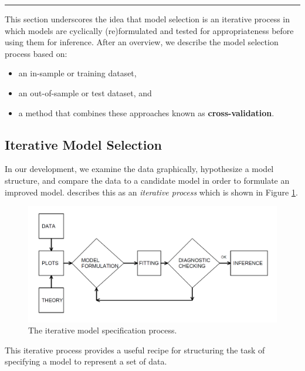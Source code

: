 \documentclass[]{book}
\providecommand{\tightlist}{%
  \setlength{\itemsep}{0pt}\setlength{\parskip}{0pt}}
\theoremstyle{definition}
\theoremstyle{definition}
\theoremstyle{definition}
\theoremstyle{remark}
\begin{document}
\begin{center}\rule{0.5\linewidth}{\linethickness}\end{center}

This section underscores the idea that model selection is an iterative
process in which models are cyclically (re)formulated and tested for
appropriateness before using them for inference. After an overview, we
describe the model selection process based on:

\begin{itemize}
\tightlist
\item
  an in-sample or training dataset,
\item
  an out-of-sample or test dataset, and
\item
  a method that combines these approaches known as
  \textbf{cross-validation}.
\end{itemize}

\subsection{Iterative Model Selection}\label{iterative-model-selection}

In our development, we examine the data graphically, hypothesize a model
structure, and compare the data to a candidate model in order to
formulate an improved model. \citet{box1980sampling} describes this as
an \emph{iterative process} which is shown in Figure
\ref{fig:Iterative}.

\begin{figure}

{\centering \includegraphics[width=0.8\linewidth]{Figures/F5Iterative} 

}

\caption{The iterative model specification process.}\label{fig:Iterative}
\end{figure}

This iterative process provides a useful recipe for structuring the task
of specifying a model to represent a set of data.
\end{document}
